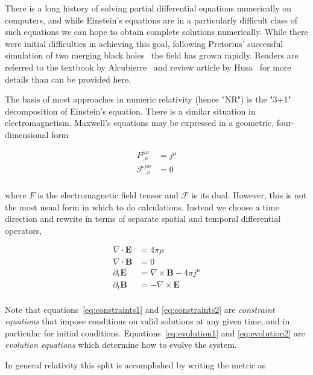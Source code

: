 There is a long history of solving partial differential equations
numerically on computers, and while Einstein's equations are in a
particularly difficult class of such equations we can hope to obtain
complete solutions numerically.  While there were initial difficulties
in achieving this goal, following Pretorius' successful simulation of
two merging black holes~\cite{Pretorius:2005gq} the field has grown
rapidly.  Readers are referred to the textbook by
Alcubierre~\cite{alcubierreTextbook} and review article by
Husa~\cite{Husa:2007zz} for more details than can be provided here.

The basis of most approaches in numeric relativity (hence "NR") is the
"3+1" decomposition of Einstein's equation.  There is a similar
situation in electromagnetism.  Maxwell's equations may be expressed
in a geometric, four-dimensional form

\begin{align*}
F^{\mu\nu}_{,\nu} &= j^\mu \\
\mathcal{F}^{\mu\nu}_{,\nu} &= 0 \\
\end{align*}

where $F$ is the electromagnetic field tensor and $\mathcal{F}$ is its dual.
However, this is not the most usual form in which to do calculations.
Instead we choose a time direction and rewrite in terms of separate
spatial and temporal differential operators,


\begin{align}
\label{eq:constraints1}
\nabla \cdot \mathbf{E} &= 4\pi \rho \\
\label{eq:constraints2}
\nabla \cdot \mathbf{B} &= 0 \\
\label{eq:evolution1}
\partial_t \mathbf{E}   &= \nabla \times \mathbf{B} - 4\pi j^\mu \\
\label{eq:evolution2}
\partial_t \mathbf{B}   &= - \nabla \times \mathbf{E} \\ \nonumber
\end{align}

Note that equations~\ref{eq:constraints1} and \ref{eq:constraints2}
are \emph{constraint equations} that impose conditions on valid
solutions at any given time, and in particular for initial conditions.
Equations~\ref{eq:evolution1} and \ref{eq:evolution2} are
\emph{evolution equations} which determine how to evolve the system.

In general relativity this split is accomplished by writing the metric
as 

